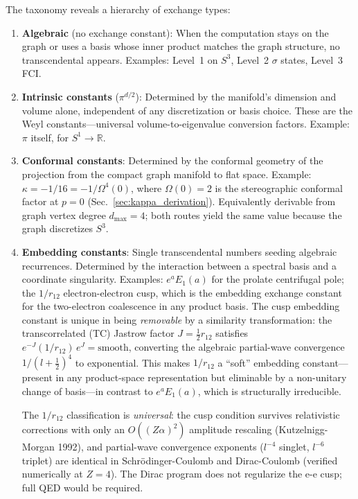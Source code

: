\documentclass[aps,pra,twocolumn,superscriptaddress,longbibliography]{revtex4-2}
\begin{document}
The taxonomy reveals a hierarchy of exchange types:
\begin{enumerate}
  \item \textbf{Algebraic} (no exchange constant): When the
    computation stays on the graph or uses a basis whose inner
    product matches the graph structure, no transcendental
    appears.  Examples: Level~1 on $S^3$, Level~2 $\sigma$
    states, Level~3 FCI.

  \item \textbf{Intrinsic constants} ($\pi^{d/2}$): Determined
    by the manifold's dimension and volume alone, independent of
    any discretization or basis choice.  These are the Weyl
    constants---universal volume-to-eigenvalue conversion factors.
    Example: $\pi$ itself, for $S^1 \to \mathbb{R}$.

  \item \textbf{Conformal constants}: Determined by the conformal
    geometry of the projection from the compact graph manifold to
    flat space.  Example:
    $\kappa = -1/16 = -1/\Omega^4(0)$, where $\Omega(0) = 2$ is
    the stereographic conformal factor at $p = 0$
    (Sec.~\ref{sec:kappa_derivation}).  Equivalently derivable
    from graph vertex degree $d_{\max} = 4$; both routes yield
    the same value because the graph discretizes $S^3$.

  \item \textbf{Embedding constants}: Single transcendental
    numbers seeding algebraic recurrences.  Determined by the
    interaction between a spectral basis and a coordinate
    singularity.  Examples: $e^a E_1(a)$ for the prolate
    centrifugal pole; the $1/r_{12}$ electron-electron cusp,
    which is the embedding exchange constant for the two-electron
    coalescence in any product basis.
    The cusp embedding constant is unique in being \emph{removable}
    by a similarity transformation: the transcorrelated (TC)
    Jastrow factor $J = \tfrac{1}{2} r_{12}$ satisfies
    $e^{-J} (1/r_{12})\, e^{J} = \text{smooth}$, converting
    the algebraic partial-wave convergence $1/(l+\tfrac{1}{2})^4$
    to exponential.  This makes $1/r_{12}$ a ``soft'' embedding
    constant---present in any product-space representation but
    eliminable by a non-unitary change of basis---in contrast to
    $e^a E_1(a)$, which is structurally irreducible.

    The $1/r_{12}$ classification is \emph{universal}: the cusp
    condition survives relativistic corrections with only an
    $O((Z\alpha)^2)$ amplitude rescaling (Kutzelnigg-Morgan 1992), and
    partial-wave convergence exponents ($l^{-4}$ singlet, $l^{-6}$
    triplet) are identical in Schr\"odinger-Coulomb and Dirac-Coulomb
    (verified numerically at $Z=4$).  The Dirac program does not
    regularize the e-e cusp; full QED would be required.


\end{enumerate}
\end{document}
